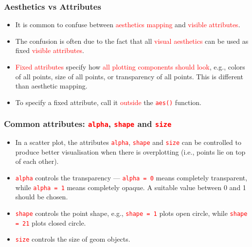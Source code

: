 \documentclass{beamer}
\begin{document}
\begin{frame}\frametitle{Aesthetics vs Attributes}
\begin{itemize}
\item It is common to confuse between \textcolor{red}{aesthetics mapping} and \textcolor{red}{visible attributes}.

\vspace{0.2in}

\item<2-> The confusion is often due to the fact that all \textcolor{red}{visual aesthetics} can be used as fixed \textcolor{red}{visible attributes}.

\vspace{0.2in}

\item<3-> \textcolor{red}{Fixed attributes} specify how \textcolor{red}{all plotting components should look}, e.g., colors of all points, size of all points, or transparency of all points. This is different than aesthetic mapping.

\vspace{0.2in}

\item<4-> To specify a fixed attribute, call it \textcolor{red}{outside} the \textcolor{red}{\texttt{aes()}} function.
\end{itemize} 
\end{frame}

\begin{frame}\frametitle{Common attributes: \textcolor{red}{\texttt{alpha}}, \textcolor{red}{\texttt{shape}} and \textcolor{red}{\texttt{size}}}

\begin{itemize}
\item In a scatter plot, the attributes \textcolor{red}{\texttt{alpha}}, \textcolor{red}{\texttt{shape}} and \textcolor{red}{\texttt{size}} can be controlled to produce better visualisation when there is overplotting (i.e., points lie on top of each other).

\vspace{0.1in}

\item \textcolor{red}{\texttt{alpha}} controls the transparency --- \textcolor{red}{\texttt{alpha = 0}} means completely transparent, while \textcolor{red}{\texttt{alpha = 1}} means completely opaque. A suitable value between 0 and 1 should be chosen.

\vspace{0.1in}

\item \textcolor{red}{\texttt{shape}} controls the point shape, e.g., \textcolor{red}{\texttt{shape = 1}} plots open circle, while \textcolor{red}{\texttt{shape = 21}} plots closed circle. 

\vspace{0.1in}

\item \textcolor{red}{\texttt{size}} controls the size of geom objects.
\end{itemize}

\end{frame}
\end{document}
